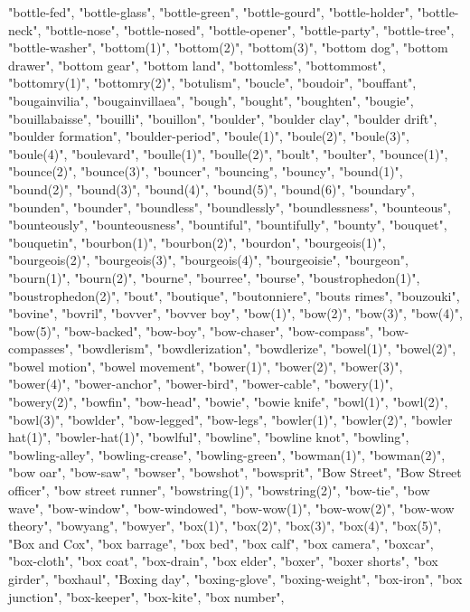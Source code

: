 "bottle-fed",
"bottle-glass",
"bottle-green",
"bottle-gourd",
"bottle-holder",
"bottle-neck",
"bottle-nose",
"bottle-nosed",
"bottle-opener",
"bottle-party",
"bottle-tree",
"bottle-washer",
"bottom(1)",
"bottom(2)",
"bottom(3)",
"bottom dog",
"bottom drawer",
"bottom gear",
"bottom land",
"bottomless",
"bottommost",
"bottomry(1)",
"bottomry(2)",
"botulism",
"boucle",
"boudoir",
"bouffant",
"bougainvilia",
"bougainvillaea",
"bough",
"bought",
"boughten",
"bougie",
"bouillabaisse",
"bouilli",
"bouillon",
"boulder",
"boulder clay",
"boulder drift",
"boulder formation",
"boulder-period",
"boule(1)",
"boule(2)",
"boule(3)",
"boule(4)",
"boulevard",
"boulle(1)",
"boulle(2)",
"boult",
"boulter",
"bounce(1)",
"bounce(2)",
"bounce(3)",
"bouncer",
"bouncing",
"bouncy",
"bound(1)",
"bound(2)",
"bound(3)",
"bound(4)",
"bound(5)",
"bound(6)",
"boundary",
"bounden",
"bounder",
"boundless",
"boundlessly",
"boundlessness",
"bounteous",
"bounteously",
"bounteousness",
"bountiful",
"bountifully",
"bounty",
"bouquet",
"bouquetin",
"bourbon(1)",
"bourbon(2)",
"bourdon",
"bourgeois(1)",
"bourgeois(2)",
"bourgeois(3)",
"bourgeois(4)",
"bourgeoisie",
"bourgeon",
"bourn(1)",
"bourn(2)",
"bourne",
"bourree",
"bourse",
"boustrophedon(1)",
"boustrophedon(2)",
"bout",
"boutique",
"boutonniere",
"bouts rimes",
"bouzouki",
"bovine",
"bovril",
"bovver",
"bovver boy",
"bow(1)",
"bow(2)",
"bow(3)",
"bow(4)",
"bow(5)",
"bow-backed",
"bow-boy",
"bow-chaser",
"bow-compass",
"bow-compasses",
"bowdlerism",
"bowdlerization",
"bowdlerize",
"bowel(1)",
"bowel(2)",
"bowel motion",
"bowel movement",
"bower(1)",
"bower(2)",
"bower(3)",
"bower(4)",
"bower-anchor",
"bower-bird",
"bower-cable",
"bowery(1)",
"bowery(2)",
"bowfin",
"bow-head",
"bowie",
"bowie knife",
"bowl(1)",
"bowl(2)",
"bowl(3)",
"bowlder",
"bow-legged",
"bow-legs",
"bowler(1)",
"bowler(2)",
"bowler hat(1)",
"bowler-hat(1)",
"bowlful",
"bowline",
"bowline knot",
"bowling",
"bowling-alley",
"bowling-crease",
"bowling-green",
"bowman(1)",
"bowman(2)",
"bow oar",
"bow-saw",
"bowser",
"bowshot",
"bowsprit",
"Bow Street",
"Bow Street officer",
"bow street runner",
"bowstring(1)",
"bowstring(2)",
"bow-tie",
"bow wave",
"bow-window",
"bow-windowed",
"bow-wow(1)",
"bow-wow(2)",
"bow-wow theory",
"bowyang",
"bowyer",
"box(1)",
"box(2)",
"box(3)",
"box(4)",
"box(5)",
"Box and Cox",
"box barrage",
"box bed",
"box calf",
"box camera",
"boxcar",
"box-cloth",
"box coat",
"box-drain",
"box elder",
"boxer",
"boxer shorts",
"box girder",
"boxhaul",
"Boxing day",
"boxing-glove",
"boxing-weight",
"box-iron",
"box junction",
"box-keeper",
"box-kite",
"box number",
